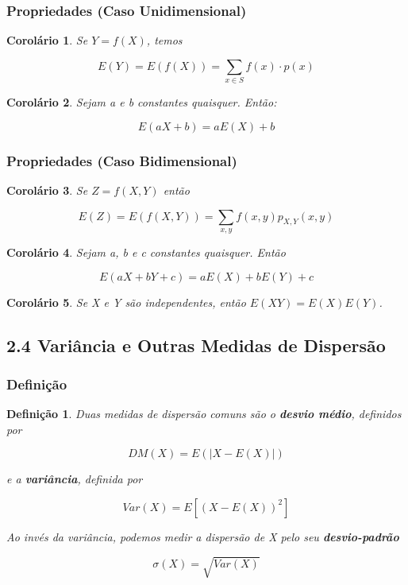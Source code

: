 \documentclass[12pt]{article}
\newtheorem{corollary}{Corolário}[theorem]
\newtheorem{definition}{Definição}
\begin{document}
\subsubsection*{Propriedades (Caso Unidimensional)}
\begin{corollary}
Se $Y = f(X)$, temos

$$E(Y) = E(f(X)) = \sum_{x \in S} f(x) \cdot p(x)$$
\end{corollary}

\begin{corollary}
Sejam a e b constantes quaisquer. Então:

$$E(a X + b) = a E(X) + b$$
\end{corollary}

\subsubsection*{Propriedades (Caso Bidimensional)}
\begin{corollary}
Se $Z = f(X, Y)$ então

$$E(Z) = E(f(X, Y)) = \sum_{x, y} f(x, y) p_{X, Y} (x, y)$$
\end{corollary}

\begin{corollary}
Sejam a, b e c constantes quaisquer. Então

$$E(a X + b Y + c) = a E(X) + b E(Y) + c$$
\end{corollary}

\begin{corollary}
Se X e Y são independentes, então $E(X Y) = E(X) E(Y)$.
\end{corollary}

\subsection*{2.4 Variância e Outras Medidas de Dispersão}
\label{s8}

\subsubsection*{Definição}

\begin{definition}
    Duas medidas de dispersão comuns são o \textbf{desvio médio}, definidos por
    
    $$D M (X) = E(|X - E(X)|)$$
    
    e a \textbf{variância}, definida por
    
    $$Var(X) = E[(X - E(X))^2]$$
    
    Ao invés da variância, podemos medir a dispersão de X pelo seu \textbf{desvio-padrão}
    
    $$\sigma (X) = \sqrt{Var(X)}$$
\end{definition}
\end{document}
